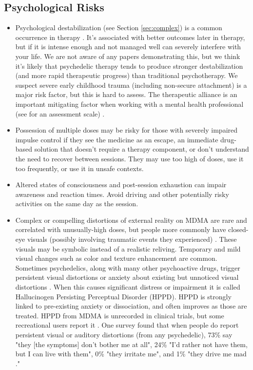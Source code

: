 \documentclass[12pt,letterpaper]{book}
\begin{document}
\subsection*{Psychological Risks}
\begin{itemize}
    \item Psychological destabilization (see Section \ref{sec:complex}) is a common occurrence in therapy \cite{olthofDestabilization}. It's associated with better outcomes later in therapy, but if it is intense enough and not managed well can severely interfere with your life. We are not aware of any papers demonstrating this, but we think it's likely that psychedelic therapy tends to produce stronger destabilization (and more rapid therapeutic progress) than traditional psychotherapy. We suspect severe early childhood trauma (including non-secure attachment) is a major risk factor, but this is hard to assess. The therapeutic alliance is an important mitigating factor when working with a mental health professional (see \textcite{BRWAIdownload} for an assessment scale) \cite{fluckiger2018alliance}.
    \item Possession of multiple doses may be risky for those with severely impaired impulse control if they see the medicine as an escape, an immediate drug-based solution that doesn't require a therapy component, or don't understand the need to recover between sessions. They may use too high of doses, use it too frequently, or use it in unsafe contexts.
    \item Altered states of consciousness and post-session exhaustion can impair awareness and reaction times. Avoid driving and other potentially risky activities on the same day as the session.
    \item Complex or compelling distortions of external reality on MDMA are rare and correlated with unusually-high doses, but people more commonly have closed-eye visuals (possibly involving traumatic events they experienced) \cite{liechtiGender}. These visuals may be symbolic instead of a realistic reliving. Temporary and mild visual changes such as color and texture enhancement are common. Sometimes psychedelics, along with many other psychoactive drugs, trigger persistent visual distortions or anxiety about existing but unnoticed visual distortions \cite{alexanderHPPD,halpernHPPD}. When this causes significant distress or impairment it is called Hallucinogen Persisting Perceptual Disorder (HPPD). HPPD is strongly linked to pre-existing anxiety or dissociation, and often improves as those are treated. HPPD from MDMA is unrecorded in clinical trials, but some recreational users report it \cite{vizeliActuteEffects,litjensHPPD}. One survey found that when people do report persistent visual or auditory distortions (from any psychedelic), 73\% say "they [the symptoms] don't bother me at all", 24\% "I'd rather not have them, but I can live with them", 0\% "they irritate me", and 1\% "they drive me mad \cite{carhart2010user}."

\end{itemize}
\end{document}
